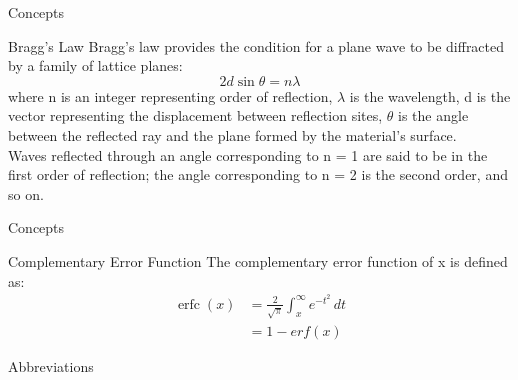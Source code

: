 \documentclass{beamer}
\DeclareMathOperator{\erfc}{erfc}
\begin{document}
\begin{frame}{Concepts}
\begin{block}{Bragg's Law}
Bragg's law provides the condition for a plane wave to be diffracted by a family of lattice planes: 
$$ 2d\sin \theta = n\lambda$$
where n is an integer representing order of reflection, $\lambda$ is the wavelength, d is the vector representing the displacement between reflection sites, $\theta$ is the angle between the reflected ray and the plane formed by the material's surface.
\\Waves reflected through an angle corresponding to n = 1 are said to be in the first order of reflection; the angle corresponding to n = 2 is the second order, and so on.
\end{block}
\end{frame}
\begin{frame}{Concepts}
\begin{block}{Complementary Error Function}
The complementary error function of x is defined as:
\begin{align}
    \erfc(x) &= \frac{2}{\sqrt{\pi}} \int_{x}^{\infty}e^{-t^2} \,dt
    \\ &= 1 - erf(x)
\end{align}
\end{block}
\end{frame}
\begin{frame}{Abbreviations}
\begin{center}
\begin{table}[h]
    \centering
    \caption{Abbreviations used in presentation}
    \label{table 5}
\end{table}
\end{center}
\end{frame}
\end{document}
